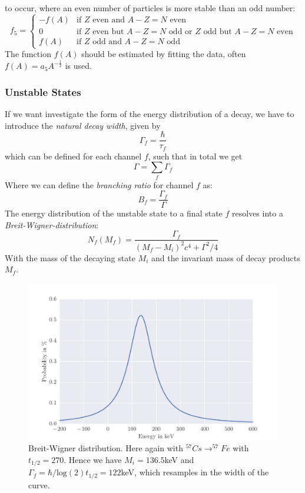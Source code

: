 \begin{itemize}
        to occur, where an even number of particles is more stable than an odd number:
      \begin{equation}
          f_5   =
          \begin{cases}
              -f(A) & \text{if $Z$ even and $A-Z=N$ even}\\
              0     & \text{if $Z$ even but $A-Z=N$ odd or $Z$ odd but $A-Z=N$ even}\\
              f(A)  & \text{if $Z$ odd and $A-Z=N$ odd}
          \end{cases}
          \label{eq:pair}
      \end{equation}
      The function $f(A)$ should be estimated by fitting the data, 
      often $f(A) = a_5 A^{-\frac{1}{2}}$ is used.
\end{itemize}
\subsubsection{Unstable States}
\label{ssub:Unstable States}
If we want investigate the form of the energy distribution of a decay, we have to 
introduce the \textit{natural decay width}, given by
\begin{equation}
    \Gamma_f = \frac{\hbar}{\tau_f} 
\end{equation}
which can be defined for each channel $f$, such that in total we get
\begin{equation}
    \Gamma = \sum_{f} \Gamma_f
\end{equation}
Where we can define the \textit{branching ratio} for channel $f$ as:
\begin{equation}
    B_f = \frac{\Gamma_f}{\Gamma}
\end{equation}
The energy distribution of the unstable state to a final state $f$ resolves into a 
\textit{Breit-Wigner-distribution}:
\begin{equation}
    N_f(M_f) = \frac{\Gamma_f}{(M_f-M_i)^2 c^4 + \Gamma^2/4}
\end{equation}
With the mass of the decaying state $M_i$ and the invariant mass of decay products $M_f$.
\begin{figure}[htpb]
    \centering
    \includegraphics[width=0.9\linewidth]{analysis/figures/breit_wigner}
    \caption{Breit-Wigner distribution. Here again with
        $^{57}Cs\rightarrow ^{57}Fe$ with $t_{1/2}=270$. Hence we have $M_i = 136.5$keV and
    $\Gamma_f = \hbar / \textrm{log}(2)t_{1/2} = 122$keV, which resamples in the width of the curve.}
    \label{fig:name}
\end{figure}
\clearpage


